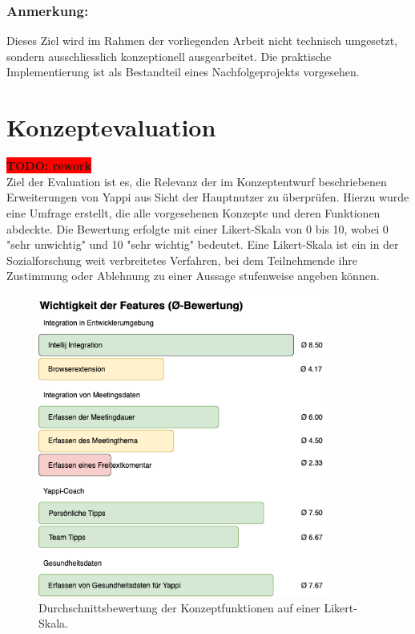 \documentclass[12pt,a4paper]{report}
\newcommand{\todo}[1]{\colorbox{red}{\textbf{TODO: #1}}\\}
\begin{document}
\subsubsection{Anmerkung:}

Dieses Ziel wird im Rahmen der vorliegenden Arbeit nicht technisch umgesetzt, sondern ausschliesslich konzeptionell ausgearbeitet.
Die praktische Implementierung ist als Bestandteil eines Nachfolgeprojekts vorgesehen.

\section{Konzeptevaluation}

\todo{rework}

Ziel der Evaluation ist es, die Relevanz der im Konzeptentwurf beschriebenen Erweiterungen von Yappi aus
Sicht der Hauptnutzer zu überprüfen.
Hierzu wurde eine Umfrage erstellt, die alle vorgesehenen Konzepte und deren Funktionen abdeckte.
Die Bewertung erfolgte mit einer Likert-Skala von 0 bis 10, wobei 0 "sehr unwichtig" und 10 "sehr wichtig" bedeutet.
Eine Likert-Skala ist ein in der Sozialforschung weit verbreitetes Verfahren, bei dem Teilnehmende ihre Zustimmung
oder Ablehnung zu einer Aussage stufenweise angeben können.

\begin{figure}[H]
  \centering
  \includegraphics[width=0.85\textwidth]{../figures/konzept-eval-feature-wichtigkeit.drawio.png}
  \caption{Durchschnittsbewertung der Konzeptfunktionen auf einer Likert-Skala.}
  \label{fig:konzept-eval-feature-wichtigkeit}
\end{figure}
\end{document}
